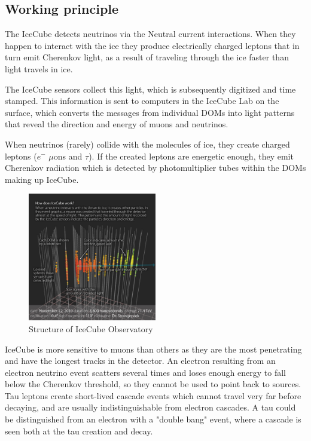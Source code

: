 \documentclass{report}
\begin{document}
\subsection{Working principle}
The IceCube detects neutrinos via the Neutral current interactions. 
When they happen to interact with the ice they produce electrically charged leptons that in turn emit Cherenkov light, as a result of traveling through the ice faster than light travels in ice.

The IceCube sensors collect this light, which is subsequently digitized and time stamped. This information is sent to computers in the IceCube Lab on the surface, which converts the messages from individual DOMs into light patterns that reveal the direction and energy of muons and neutrinos.

When neutrinos (rarely) collide with the molecules of ice, they create charged leptons ($e^-$ $\mu$ons and $\tau$). If the created leptons are energetic enough, they emit Cherenkov radiation which is detected by photomultiplier tubes within the DOMs making up IceCube.

\begin{figure}[htb]
    \centering
    \includegraphics[width=0.5\textwidth,keepaspectratio]{Images/how_does_icecube_work.jpg}
    \caption{Structure of IceCube Observatory}
    \label{fig:IC_schematic}
\end{figure}
IceCube is more sensitive to muons than others as they are the most penetrating and have the longest tracks in the detector. An electron resulting from an electron neutrino event scatters several times and loses enough energy to fall below the Cherenkov threshold, so they cannot be used to point back to sources. Tau leptons create short-lived cascade events which cannot travel very far before decaying, and are usually indistinguishable from electron cascades. A tau could be distinguished from an electron with a "double bang" event, where a cascade is seen both at the tau creation and decay. 
\end{document}
